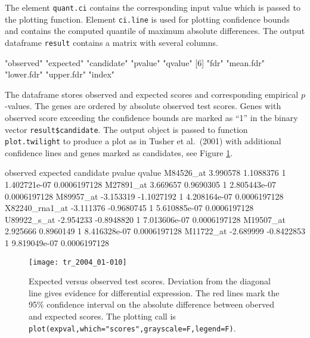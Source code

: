 \documentclass[11pt,a4paper,fleqn]{report}
\newcommand{\Robject}[1]{{\texttt{#1}}}
\newcommand{\Rfunction}[1]{{\texttt{#1}}}
\begin{document}
The element \Robject{quant.ci} contains the corresponding input value which is passed to the plotting function. Element \Robject{ci.line} is used for plotting confidence bounds and contains the computed quantile of maximum absolute differences.  The output dataframe \Robject{result} contains a matrix with several columns.
\begin{Schunk}
\begin{Soutput}
 [1] "observed"  "expected"  "candidate" "pvalue"    "qvalue"   
 [6] "fdr"       "mean.fdr"  "lower.fdr" "upper.fdr" "index"    
\end{Soutput}
\end{Schunk}

The dataframe stores observed and expected scores and corresponding empirical $p$-values. The genes are ordered by absolute observed test scores. Genes with observed score exceeding the confidence bounds are marked as ``1'' in the binary vector \Robject{result\$candidate}. The output object is passed to function \Rfunction{plot.twilight} to produce a plot as in Tusher et al.~(2001) \cite{tusher01} with additional confidence lines and genes marked as candidates, see Figure \ref{fig_scores}.
{\small
\begin{Schunk}
\begin{Soutput}
                observed   expected candidate       pvalue       qvalue
M84526_at       3.990578  1.1088376         1 1.402721e-07 0.0006197128
M27891_at       3.669657  0.9690305         1 2.805443e-07 0.0006197128
M89957_at      -3.153319 -1.1027192         1 4.208164e-07 0.0006197128
X82240_rna1_at -3.111376 -0.9680745         1 5.610885e-07 0.0006197128
U89922_s_at    -2.954233 -0.8948820         1 7.013606e-07 0.0006197128
M19507_at       2.925666  0.8960149         1 8.416328e-07 0.0006197128
M11722_at      -2.689999 -0.8422853         1 9.819049e-07 0.0006197128
\end{Soutput}
\end{Schunk}
}
       
\begin{figure}[t]
\begin{center}
\texttt{[image: tr\_2004\_01-010]}
\caption{Expected versus observed test scores. Deviation from the diagonal line gives evidence for differential expression. The red lines mark the 95\% confidence interval on the absolute difference between oberved and expected scores. The plotting call is \texttt{plot(expval,which="scores",grayscale=F,legend=F)}.}\label{fig_scores}
\end{center}
\end{figure}
\end{document}
